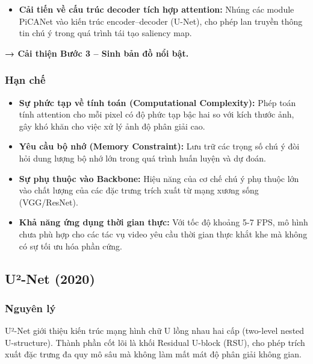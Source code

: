 \begin{itemize}
    \item \textbf{Cải tiến về cấu trúc decoder tích hợp attention:} Nhúng các module PiCANet vào kiến trúc encoder–decoder (U-Net), cho phép lan truyền thông tin chú ý trong quá trình tái tạo saliency map.
\end{itemize}
\textbf{→ Cải thiện Bước 3 – Sinh bản đồ nổi bật.}

\subsubsection{Hạn chế}
\begin{itemize}
    \item \textbf{Sự phức tạp về tính toán (Computational Complexity):} Phép toán tính attention cho mỗi pixel có độ phức tạp bậc hai so với kích thước ảnh, gây khó khăn cho việc xử lý ảnh độ phân giải cao.
    \item \textbf{Yêu cầu bộ nhớ (Memory Constraint):} Lưu trữ các trọng số chú ý đòi hỏi dung lượng bộ nhớ lớn trong quá trình huấn luyện và dự đoán.
    \item \textbf{Sự phụ thuộc vào Backbone:} Hiệu năng của cơ chế chú ý phụ thuộc lớn vào chất lượng của các đặc trưng trích xuất từ mạng xương sống (VGG/ResNet).
    \item \textbf{Khả năng ứng dụng thời gian thực:} Với tốc độ khoảng 5-7 FPS, mô hình chưa phù hợp cho các tác vụ video yêu cầu thời gian thực khắt khe mà không có sự tối ưu hóa phần cứng.
\end{itemize}

\newpage
\subsection{U²-Net (2020)}
\subsubsection{Nguyên lý}

U²-Net \cite{u2net_2020} giới thiệu kiến trúc mạng hình chữ U lồng nhau hai cấp (two-level nested U-structure). Thành phần cốt lõi là khối Residual U-block (RSU), cho phép trích xuất đặc trưng đa quy mô sâu mà không làm mất mát độ phân giải không gian.

